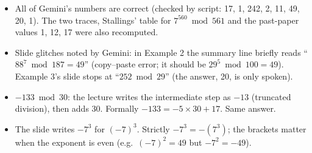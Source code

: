 \begin{fixbox}
\begin{itemize}
  \item All of Gemini's numbers are correct (checked by script: 17, 1, 242, 2, 11, 49, 20, 1). The two traces, Stallings' table for $7^{560} \bmod 561$ and the past-paper values 1, 12, 17 were also recomputed.
  \item Slide glitches noted by Gemini: in Example 2 the summary line briefly reads ``$88^7 \bmod 187 = 49$'' (copy--paste error; it should be $29^5 \bmod 100 = 49$). Example 3's slide stops at ``$252 \bmod 29$'' (the answer, 20, is only spoken).
  \item $-133 \bmod 30$: the lecture writes the intermediate step as $-13$ (truncated division), then adds 30. Formally $-133 = -5 \times 30 + 17$. Same answer.
  \item The slide writes $-7^3$ for $(-7)^3$. Strictly $-7^3 = -(7^3)$; the brackets matter when the exponent is even (e.g.\ $(-7)^2 = 49$ but $-7^2 = -49$).
\end{itemize}
\end{fixbox}
